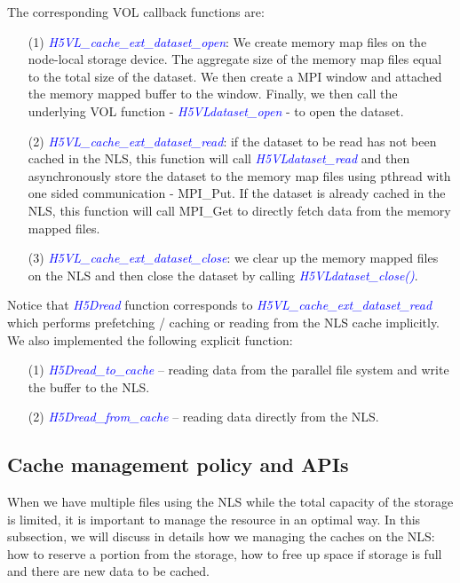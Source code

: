 \documentclass[aps, prb, 11pt, notitlepage]{revtex4-1}
\def\function#1{\textcolor{blue}{{\it #1}}}
\begin{document}
The corresponding VOL callback functions are: 
\begin{itemize}
\item [(1)] \function{H5VL\_cache\_ext\_dataset\_open}: We create memory map files on the node-local storage device. The aggregate size of the memory map files equal to the total size of the dataset. We then create a MPI window and attached the memory mapped buffer to the window. Finally, we then call the underlying VOL function - \function{H5VLdataset\_open} - to open the dataset. 
\item [(2)] \function{H5VL\_cache\_ext\_dataset\_read}: if the dataset to be read has not been cached in the NLS, this function will call \function{H5VLdataset\_read} and then asynchronously store the dataset to the memory map files using pthread with one sided communication - MPI\_Put. If the dataset is already cached in the NLS, this function will call MPI\_Get to directly fetch data from the memory mapped files. 
\item [(3)] \function{H5VL\_cache\_ext\_dataset\_close}: we clear up the memory mapped files on the NLS and then close the dataset by calling \function{H5VLdataset\_close()}. 
\end{itemize}
Notice that \function{H5Dread} function corresponds to \function{H5VL\_cache\_ext\_dataset\_read} which performs prefetching / caching or reading from the NLS cache implicitly. We also implemented the following explicit function: 
\begin{itemize}
\item [(1)] \function{H5Dread\_to\_cache} -- reading data from the parallel file system and write the buffer to the NLS. 
\item [(2)] \function{H5Dread\_from\_cache} -- reading data directly from the NLS.
\end{itemize}

\subsection{Cache management policy and APIs}
When we have multiple files using the NLS while the total capacity of the storage is limited, it is important to manage the resource in an optimal way. In this subsection, we will discuss in details how we managing the caches on the NLS: how to reserve a portion from the storage, how to free up space if storage is full and there are new data to be cached. 
\end{document}
